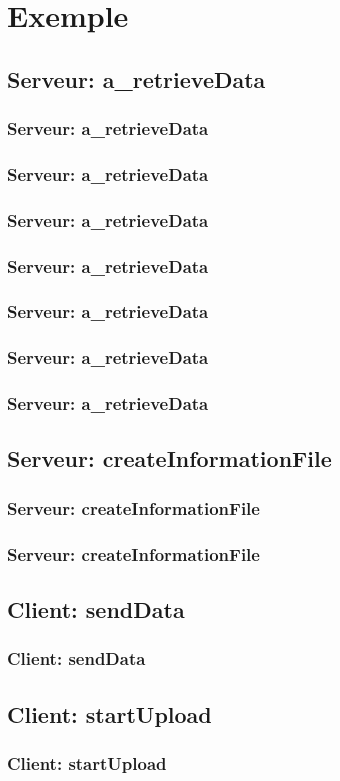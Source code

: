\documentclass[11pt]{beamer}
\begin{document}
\section{Exemple}
	\subsection{Serveur: a\_retrieveData}

		\begin{frame}
			\frametitle{Serveur: a\_retrieveData}
			
		\end{frame}

		\begin{frame}
			\frametitle{Serveur: a\_retrieveData}
			
		\end{frame}

		\begin{frame}
			\frametitle{Serveur: a\_retrieveData}
			
		\end{frame}

		\begin{frame}
			\frametitle{Serveur: a\_retrieveData}
			
		\end{frame}

		\begin{frame}
			\frametitle{Serveur: a\_retrieveData}
			
		\end{frame}

		\begin{frame}
			\frametitle{Serveur: a\_retrieveData}
			
		\end{frame}

		\begin{frame}
			\frametitle{Serveur: a\_retrieveData}
			
		\end{frame}

	\subsection{Serveur: createInformationFile}

		\begin{frame}
			\frametitle{Serveur: createInformationFile}
			
		\end{frame}

		\begin{frame}
			\frametitle{Serveur: createInformationFile}
			
		\end{frame}

	\subsection{Client: sendData}
	
		\begin{frame}
			\frametitle{Client: sendData}
			
		\end{frame}

	\subsection{Client: startUpload}
	
		\begin{frame}
			\frametitle{Client: startUpload}
			
		\end{frame}
\end{document}
